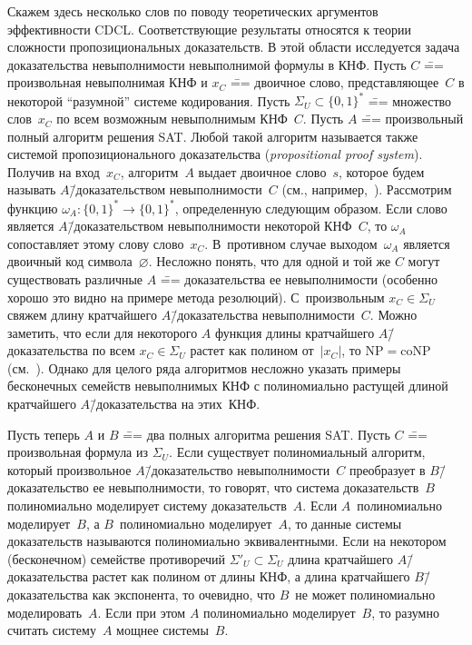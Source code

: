 Скажем здесь несколько слов по поводу теоретических аргументов эффективности CDCL.
Соответствующие результаты относятся к теории сложности пропозициональных доказательств.
В этой области исследуется задача доказательства невыполнимости невыполнимой формулы в КНФ.
Пусть $C$ \=== произвольная невыполнимая КНФ и $x_{C}$ \=== двоичное слово, представляющее~$C$ в некоторой \enquote{разумной} системе кодирования.
Пусть $\Sigma_{U} \subset \{ 0,1 \}^{*}$ \=== множество слов~$x_{C}$ по всем возможным невыполнимым КНФ~$C$.
Пусть $A$ \=== произвольный полный алгоритм решения SAT.
Любой такой алгоритм называется также системой пропозиционального доказательства (\textit{propositional proof system}).
Получив на вход~$x_{C}$, алгоритм~$A$ выдает двоичное слово~$s$, которое будем называть $A$\=/доказательством невыполнимости~$C$ (см., например,~\cite{razborov2002}).
Рассмотрим функцию $\omega_{A} \colon \{ 0,1 \}^{*} \to \{ 0,1 \}^{*}$, определенную следующим образом.
Если слово является $A$\=/доказательством невыполнимости некоторой КНФ~$C$, то $\omega_{A}$ сопоставляет этому слову слово~$x_{C}$.
В~противном случае выходом~$\omega_{A}$ является двоичный код символа~$\varnothing$.
Несложно понять, что для одной и той же $C$ могут существовать различные $A$ \=== доказательства ее невыполнимости (особенно хорошо это видно на примере метода резолюций).
С~произвольным $x_{C} \in \Sigma_{U}$ свяжем длину кратчайшего $A$\=/доказательства невыполнимости~$C$.
Можно заметить, что если для некоторого $A$ функция длины кратчайшего $A$\=/доказательства по всем $x_{C} \in \Sigma_{U}$ растет как полином от~$|x_{C}|$, то $\mathrm{NP} = \mathrm{coNP}$ (см.~\cite{cook1979}).
Однако для целого ряда алгоритмов несложно указать примеры бесконечных семейств невыполнимых КНФ с полиномиально растущей длиной кратчайшего $A$\=/доказательства на этих~КНФ.

Пусть теперь $A$ и $B$ \=== два полных алгоритма решения SAT.
Пусть $C$ \=== произвольная формула из $\Sigma_{U}$.
Если существует полиномиальный алгоритм, который произвольное $A$\=/доказательство невыполнимости~$C$ преобразует в $B$\=/доказательство ее невыполнимости, то говорят, что система доказательств~$B$ полиномиально моделирует систему доказательств~$A$.
Если $A$~полиномиально моделирует~$B$, а $B$~полиномиально моделирует~$A$, то данные системы доказательств называются полиномиально эквивалентными.
Если на некотором (бесконечном) семействе противоречий ${\Sigma'}_{U} \subset \Sigma_{U}$ длина кратчайшего $A $\=/доказательства растет как полином от длины КНФ, а длина кратчайшего $B$\=/доказательства как экспонента, то очевидно, что $B$~не может полиномиально моделировать~$A$.
Если при этом $A$ полиномиально моделирует~$B$, то разумно считать систему~$A$ мощнее системы~$B$.

